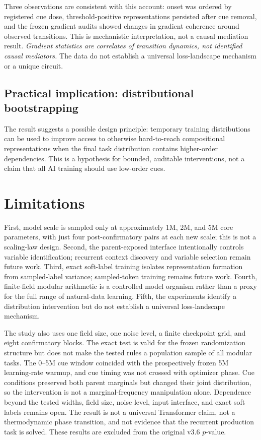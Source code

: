 \documentclass{article}
\begin{document}
Three observations are consistent with this account: onset was ordered by
registered cue dose, threshold-positive representations persisted after cue
removal, and the frozen gradient audits showed changes in gradient coherence
around observed transitions. This is mechanistic interpretation, not a causal
mediation result. \emph{Gradient statistics are correlates of transition
dynamics, not identified causal mediators.} The data do not establish a
universal loss-landscape mechanism or a unique circuit.

\subsection{Practical implication: distributional bootstrapping}
The result suggests a possible design principle: temporary training
distributions can be used to improve access to otherwise hard-to-reach
compositional representations when the final task distribution contains
higher-order dependencies. This is a hypothesis for bounded, auditable
interventions, not a claim that all AI training should use low-order cues.

\section{Limitations}
First, model scale is sampled only at approximately 1M, 2M, and 5M core
parameters, with just four post-confirmatory pairs at each new scale; this is
not a scaling-law design. Second, the parent-exposed interface
intentionally controls variable identification; recurrent context discovery
and variable selection remain future work. Third, exact soft-label training
isolates representation formation from sampled-label variance; sampled-token
training remains future work. Fourth, finite-field modular arithmetic is a
controlled model organism rather than a proxy for the full range of
natural-data learning. Fifth, the experiments identify a distribution
intervention but do not establish a universal loss-landscape mechanism.

The study also uses one field size, one noise level, a finite checkpoint grid,
and eight confirmatory blocks. The exact test is valid for the frozen
randomization structure but does not make the tested rules a population sample
of all modular tasks. The 0--5M cue window coincided with the prospectively
frozen 5M learning-rate warmup, and cue timing was not crossed with optimizer
phase. Cue conditions preserved both parent marginals but changed their joint
distribution, so the intervention is not a marginal-frequency manipulation
alone. Dependence beyond the tested widths, field size, noise level, input
interface, and exact soft labels remains open. The result is not a universal Transformer
claim, not a thermodynamic phase transition, and not evidence that the
recurrent production task is solved. These results are excluded from the
original v3.6 $p$-value.
\end{document}

